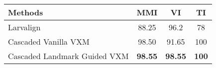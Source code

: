 \begin{adjustbox}{width=0.6\columnwidth}
\begin{tabular}{lccc}
\hline
 ﻿Methods  & MMI   & VI    & TI  \\ \hline \hline
 Larvalign & 88.25 & 96.2  & 78  \\
 Cascaded Vanilla VXM  & 98.50 & 91.65 & 100 \\
 Cascaded Landmark Guided VXM  & \textbf{98.55} & \textbf{98.55} & \textbf{100} \\
\hline
\end{tabular}
\end{adjustbox}